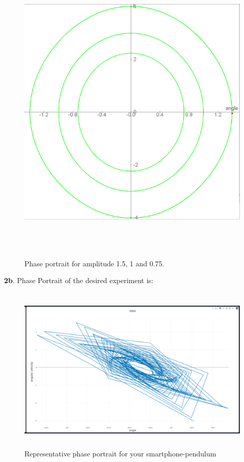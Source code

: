 \documentclass[11pt]{scrartcl} %
\begin{document}
\begin{figure}[h] %
	\centering
	\includegraphics[width=\textwidth, height=15cm]{Figures/M 2a.png} %
	\caption{Phase portrait for amplitude 1.5, 1 and 0.75.}
\end{figure}

\newpage
\textbf{2b}.
Phase Portrait of the desired experiment is:
\begin{figure}[h] %
	\centering
	\includegraphics[width=12cm, height=8cm]{Figures/M 2b.png} %
	\caption {Representative phase portrait for your smartphone-pendulum}
\end{figure}
\end{document}
